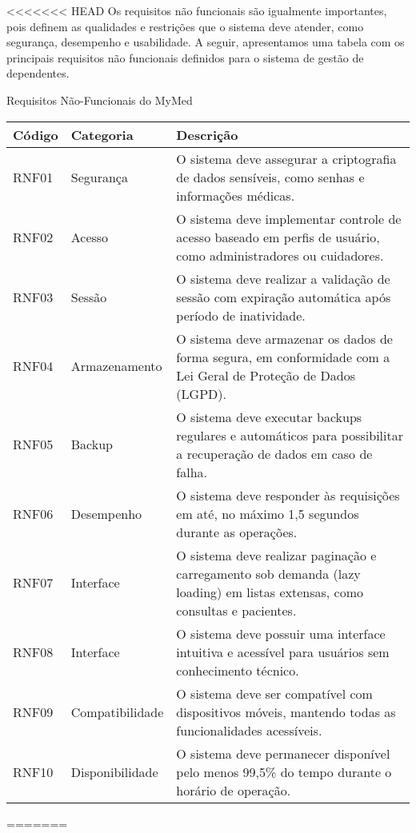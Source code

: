 <<<<<<< HEAD
Os requisitos não funcionais são igualmente importantes, pois definem as qualidades e restrições que o sistema deve atender, como segurança, desempenho e usabilidade. A seguir, apresentamos uma tabela com os principais requisitos não funcionais definidos para o sistema de gestão de dependentes.

\begin{quadro}
\caption{Requisitos Não-Funcionais do MyMed}
\begin{tabularx}{\textwidth}{|l|l|X|}
\hline
\textbf{Código} & \textbf{Categoria} & \textbf{Descrição} \\ \hline
RNF01 & Segurança & O sistema deve assegurar a criptografia de dados sensíveis, como senhas e informações médicas. \\ \hline
RNF02 & Acesso & O sistema deve implementar controle de acesso baseado em perfis de usuário, como administradores ou cuidadores. \\ \hline
RNF03 & Sessão & O sistema deve realizar a validação de sessão com expiração automática após período de inatividade. \\ \hline
RNF04 & Armazenamento & O sistema deve armazenar os dados de forma segura, em conformidade com a Lei Geral de Proteção de Dados (LGPD). \\ \hline
RNF05 & Backup & O sistema deve executar backups regulares e automáticos para possibilitar a recuperação de dados em caso de falha. \\ \hline
RNF06 & Desempenho & O sistema deve responder às requisições em até, no máximo 1,5 segundos durante as operações. \\ \hline
RNF07 & Interface & O sistema deve realizar paginação e carregamento sob demanda (lazy loading) em listas extensas, como consultas e pacientes. \\ \hline
RNF08 & Interface & O sistema deve possuir uma interface intuitiva e acessível para usuários sem conhecimento técnico. \\ \hline
RNF09 & Compatibilidade & O sistema deve ser compatível com dispositivos móveis, mantendo todas as funcionalidades acessíveis. \\ \hline
RNF10 & Disponibilidade & O sistema deve permanecer disponível pelo menos 99,5\% do tempo durante o horário de operação. \\ \hline
\end{tabularx}
\end{quadro}
=======
